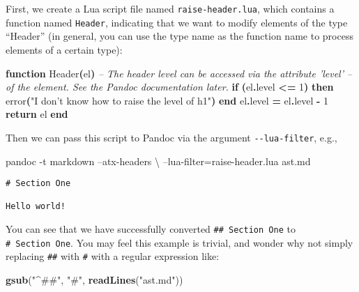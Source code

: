 \documentclass[
  11pt,
]{krantz}
\newenvironment{Shaded}{\begin{snugshade}}{\end{snugshade}}
\newcommand{\CommentTok}[1]{\textcolor[rgb]{0.37,0.37,0.37}{\textit{#1}}}
\newcommand{\ControlFlowTok}[1]{\textcolor[rgb]{0.27,0.27,0.27}{\textbf{#1}}}
\newcommand{\DecValTok}[1]{\textcolor[rgb]{0.06,0.06,0.06}{#1}}
\newcommand{\ExtensionTok}[1]{#1}
\newcommand{\FunctionTok}[1]{\textcolor[rgb]{0,0,0}{#1}}
\newcommand{\KeywordTok}[1]{\textcolor[rgb]{0.27,0.27,0.27}{\textbf{#1}}}
\newcommand{\NormalTok}[1]{#1}
\newcommand{\OperatorTok}[1]{\textcolor[rgb]{0.43,0.43,0.43}{\textbf{#1}}}
\newcommand{\StringTok}[1]{\textcolor[rgb]{0.5,0.5,0.5}{#1}}
\begin{document}
First, we create a Lua script file named \texttt{raise-header.lua}, which contains a function named \texttt{Header}, indicating that we want to modify elements of the type ``Header'' (in general, you can use the type name as the function name to process elements of a certain type):

\begin{Shaded}
\begin{Highlighting}[]
\KeywordTok{function}\NormalTok{ Header}\OperatorTok{(}\NormalTok{el}\OperatorTok{)}
  \CommentTok{-- The header level can be accessed via the attribute 'level'}
  \CommentTok{-- of the element. See the Pandoc documentation later.}
  \ControlFlowTok{if} \OperatorTok{(}\NormalTok{el}\OperatorTok{.}\NormalTok{level }\OperatorTok{<=} \DecValTok{1}\OperatorTok{)} \ControlFlowTok{then}
    \FunctionTok{error}\OperatorTok{(}\StringTok{"I don't know how to raise the level of h1"}\OperatorTok{)}
  \ControlFlowTok{end}
\NormalTok{  el}\OperatorTok{.}\NormalTok{level }\OperatorTok{=}\NormalTok{ el}\OperatorTok{.}\NormalTok{level }\OperatorTok{-} \DecValTok{1}
  \ControlFlowTok{return}\NormalTok{ el}
\ControlFlowTok{end}
\end{Highlighting}
\end{Shaded}

Then we can pass this script to Pandoc via the argument \texttt{-\/-lua-filter}, e.g.,

\begin{Shaded}
\begin{Highlighting}[]
\ExtensionTok{pandoc}\NormalTok{ -t markdown --atx-headers \textbackslash{}}
\NormalTok{  --lua-filter=raise-header.lua ast.md}
\end{Highlighting}
\end{Shaded}

\begin{verbatim}
# Section One

Hello world!
\end{verbatim}

You can see that we have successfully converted \texttt{\#\#\ Section\ One} to \texttt{\#\ Section\ One}. You may feel this example is trivial, and wonder why not simply replacing \texttt{\#\#} with \texttt{\#} with a regular expression like:

\begin{Shaded}
\begin{Highlighting}[]
\KeywordTok{gsub}\NormalTok{(}\StringTok{"^##"}\NormalTok{, }\StringTok{"#"}\NormalTok{, }\KeywordTok{readLines}\NormalTok{(}\StringTok{"ast.md"}\NormalTok{))}
\end{Highlighting}
\end{Shaded}
\end{document}
